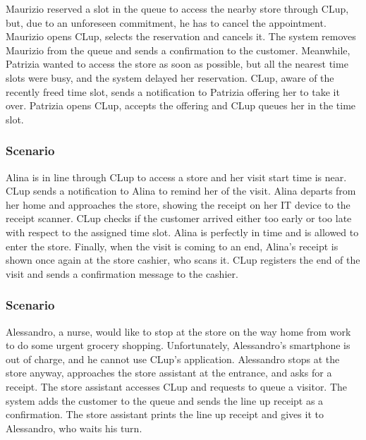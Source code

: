 \documentclass[../../main.tex]{subfiles}
\begin{document}
        Maurizio reserved a slot in the queue to access the nearby store through CLup, but, due to an unforeseen commitment, 
        he has to cancel the appointment. Maurizio opens CLup, selects the reservation and cancels it. 
        The system removes Maurizio from the queue and sends a confirmation to the customer. 
        Meanwhile, Patrizia wanted to access the store as soon as possible, but all the nearest time slots were busy, 
        and the system delayed her reservation. CLup, aware of the recently freed time slot, sends a notification to Patrizia offering her to take it over. 
        Patrizia opens CLup, accepts the offering and CLup queues her in the time slot.


      \subsubsection{Scenario }

        Alina is in line through CLup to access a store and her visit start time is near. 
        CLup sends a notification to Alina to remind her of the visit. 
        Alina departs from her home and approaches the store, showing the receipt on her IT device to the receipt scanner. 
        CLup checks if the customer arrived either too early or too late with respect to the assigned time slot. 
        Alina is perfectly in time and is allowed to enter the store. Finally, when the visit is coming to an end, 
        Alina's receipt is shown once again at the store cashier, who scans it. 
        CLup registers the end of the visit and sends a confirmation message to the cashier.


      \subsubsection{Scenario }

        Alessandro, a nurse, would like to stop at the store on the way home from work to do some urgent grocery shopping. 
        Unfortunately, Alessandro's smartphone is out of charge, and he cannot use CLup's application. 
        Alessandro stops at the store anyway, approaches the store assistant at the entrance, and asks for a receipt. 
        The store assistant accesses CLup and requests to queue a visitor. The system adds the customer to the queue and sends the line up receipt as a confirmation. 
        The store assistant prints the line up receipt and gives it to Alessandro, who waits his turn.
\end{document}
